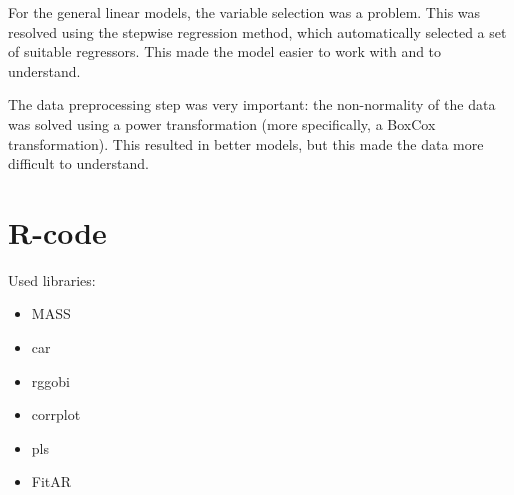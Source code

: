 \documentclass[a4paper,english,11pt,]{scrartcl}
\begin{document}
For the general linear models, the variable selection was a problem. This was resolved using the stepwise regression method, which automatically selected a set of suitable regressors. This made the model easier to work with and to understand.

The data preprocessing step was very important: the non-normality of the data was solved using a power transformation (more specifically, a BoxCox transformation). This resulted in better models, but this made the data more difficult to understand.




\clearpage
\appendix

\clearpage

\section{R-code\label{Rcode}}
Used libraries:
\begin{multicols}{2}
\begin{itemize}
 \item MASS
 \item car
 \item rggobi
 \item corrplot
 \item pls
 \item FitAR
\end{itemize}
\end{multicols}



\clearpage

\end{document}

